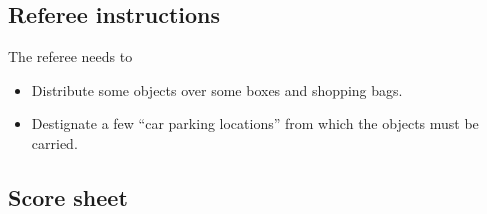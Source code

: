 \subsection{Referee instructions}

The referee needs to
\begin{itemize}
\item Distribute some objects over some boxes and shopping bags.
\item Destignate a few ``car parking locations'' from which the objects must be carried.
\end{itemize}

\subsection{Score sheet}
